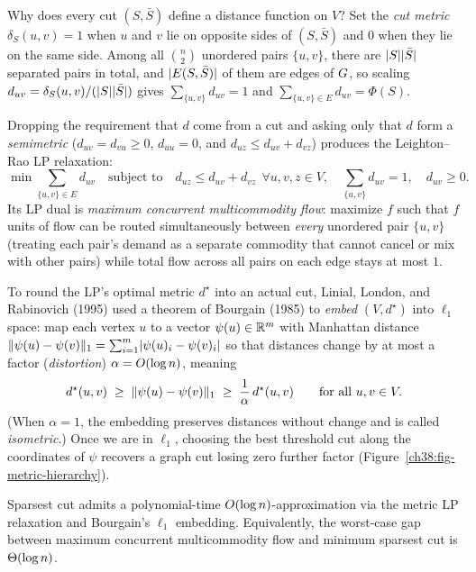 \begin{intuitionbox}
Why does every cut $(S,\bar S)$ define a distance function on $V$? Set the \emph{cut metric}
$\delta_S(u,v)=1$ when $u$ and $v$ lie on opposite sides of $(S,\bar S)$ and $0$ when they lie on the same
side. Among all $\binom{n}{2}$ unordered pairs $\{u,v\}$, there are $\lvert S\rvert\lvert\bar S\rvert$ separated pairs in
total, and $\lvert E(S,\bar S)\rvert$ of them are edges of $G$, so scaling $d_{uv} = \delta_S(u,v)/(\lvert S\rvert\lvert\bar S\rvert)$
gives $\sum_{\{u,v\}} d_{uv} = 1$ and $\sum_{\{u,v\}\in E} d_{uv} = \Phi(S)$.

Dropping the requirement that $d$ come from a cut and asking only that $d$ form a \emph{semimetric}
($d_{uv}=d_{vu}\ge 0$, $d_{uu}=0$, and $d_{uz}\le d_{uv}+d_{vz}$) produces the Leighton--Rao LP relaxation:
\[
  \min \sum_{\{u,v\}\in E} d_{uv}
  \quad\text{subject to}\quad
  d_{uz} \le d_{uv} + d_{vz}\ \ \forall u,v,z\in V,\quad
  \sum_{\{u,v\}} d_{uv} = 1,\quad d_{uv}\ge 0.
\]
Its LP dual is \emph{maximum concurrent multicommodity flow}: maximize $f$ such that $f$ units of flow can be
routed simultaneously between \emph{every} unordered pair $\{u,v\}$ (treating each pair's demand as a separate
commodity that cannot cancel or mix with other pairs) while total flow across all pairs on each edge stays at most $1$.

To round the LP's optimal metric $d^\star$ into an actual cut, Linial, London, and Rabinovich (1995) used a
theorem of Bourgain (1985) to \emph{embed} $(V,d^\star)$ into $\ell_1$ space: map each vertex $u$ to a vector
$\psi(u)\in\mathbb{R}^m$ with Manhattan distance $\lVert\psi(u)-\psi(v)\rVert_1 = \sum_{i=1}^m \lvert\psi(u)_i-\psi(v)_i\rvert$
so that distances change by at most a factor (\emph{distortion}) $\alpha = O(\log n)$, meaning
\[
  d^\star(u,v) \;\ge\; \lVert\psi(u)-\psi(v)\rVert_1 \;\ge\; \frac{1}{\alpha}\,d^\star(u,v) \qquad\text{for all } u,v\in V.
\]
(When $\alpha=1$, the embedding preserves distances without change and is called \emph{isometric}.) Once we
are in $\ell_1$, choosing the best threshold cut along the coordinates of $\psi$ recovers a graph cut losing
zero further factor (Figure~\ref{ch38:fig-metric-hierarchy}).
\end{intuitionbox}

\begin{theorem}\label{ch38:thm-lr}
Sparsest cut admits a polynomial-time $O(\log n)$-approximation via the metric LP relaxation and
Bourgain's $\ell_1$ embedding. Equivalently, the worst-case gap between maximum concurrent multicommodity
flow and minimum sparsest cut is $\Theta(\log n)$.
\end{theorem}


